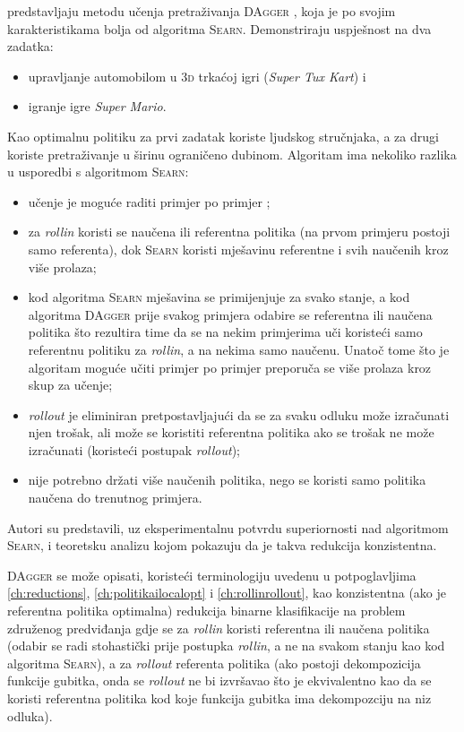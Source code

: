 \citet{ross2011reduction} predstavljaju metodu učenja pretraživanja
\textsc{DAgger} , koja je po svojim
karakteristikama bolja od algoritma \textsc{Searn}. Demonstriraju uspješnost na
dva zadatka:
\begin{itemize}
  \item upravljanje automobilom u \textsc{3d} trkaćoj igri (\textit{Super Tux
  Kart}) i
  \item igranje igre \textit{Super Mario}.
\end{itemize}
Kao optimalnu politiku za prvi zadatak koriste ljudskog stručnjaka, a za drugi
koriste pretraživanje u širinu  ograničeno
dubinom. Algoritam ima nekoliko razlika u usporedbi s algoritmom \textsc{Searn}:
\begin{itemize}
  \item učenje je moguće raditi primjer po primjer ;
  \item za \textit{rollin} koristi se naučena ili referentna politika (na prvom
  primjeru postoji samo referenta), dok \textsc{Searn} koristi mješavinu
  referentne i svih naučenih kroz više prolaza;
  \item kod algoritma \textsc{Searn} mješavina se primijenjuje za svako stanje,
  a kod algoritma \textsc{DAgger} prije svakog primjera odabire se referentna
  ili naučena politika što rezultira time da se na nekim primjerima uči koristeći
  samo referentnu politiku za \textit{rollin}, a na nekima samo naučenu. Unatoč
  tome što je algoritam moguće učiti primjer po primjer preporuča se više
  prolaza kroz skup za učenje;
  \item \textit{rollout} je eliminiran pretpostavljajući da se za svaku odluku
  može izračunati njen trošak, ali može se koristiti referentna politika ako se
  trošak ne može izračunati (koristeći postupak \textit{rollout});
  \item nije potrebno držati više naučenih politika, nego se koristi samo politika
  naučena do trenutnog primjera.
\end{itemize}
Autori su predstavili, uz eksperimentalnu potvrdu superiornosti nad algoritmom
\textsc{Searn}, i teoretsku analizu kojom pokazuju da je takva redukcija
konzistentna.

\textsc{DAgger} se može opisati, koristeći terminologiju uvedenu u potpoglavljima
\ref{ch:reductions}, \ref{ch:politikailocalopt} i \ref{ch:rollinrollout}, kao
konzistentna (ako je referentna politika optimalna) redukcija binarne
klasifikacije na problem združenog predviđanja gdje se za \textit{rollin}
koristi referentna ili naučena politika (odabir se radi stohastički prije
postupka \textit{rollin}, a ne na svakom stanju kao kod algoritma
\textsc{Searn}), a za \textit{rollout} referenta politika (ako postoji
dekompozicija funkcije gubitka, onda se \textit{rollout} ne bi izvršavao što je
ekvivalentno kao da se koristi referentna politika kod koje funkcija gubitka ima
dekompozciju na niz odluka).
